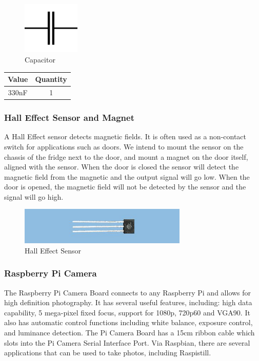 \documentclass[10pt]{article}
\begin{document}
\begin{figure}[h]
\centering
\caption{Capacitor}
\label{Capacitor}
\includegraphics[height=2.5cm]{images/capacitor_diagram.jpg}
\end{figure}

\begin{center}
	\begin{tabular}{|c|c|}
		\hline
		Value & Quantity \\ \hline
		330nF & 1 \\ \hline
	\end{tabular}
\end{center}

\subsubsection{Hall Effect Sensor and Magnet}

A Hall Effect sensor detects magnetic fields. It is often used as a non-contact switch for applications such as doors. We intend to mount the sensor on the chassis of the fridge next to the door, and mount a magnet on the door itself, aligned with the sensor. When the door is closed the sensor will detect the magnetic field from the magnetic and the output signal will go low. When the door is opened, the magnetic field will not be detected by the sensor and the signal will go high.

\begin{figure}[h]
\centering
\caption{Hall Effect Sensor}
\label{Hall Effect Sensor}
\includegraphics[width=8cm]{images/hall-effect-sensor.jpg}
\end{figure}


\subsubsection{Raspberry Pi Camera}

The Raspberry Pi Camera Board connects to any Raspberry Pi and allows for high definition photography. It has several useful features, including: high data capability, 5 mega-pixel fixed focus, support for 1080p, 720p60 and VGA90. It also has automatic control functions including white balance, exposure control, and luminance detection.
The Pi Camera Board has a 15cm ribbon cable which slots into the Pi Camera Serial Interface Port. Via Raspbian, there are several applications that can be used to take photos, including Raspistill.
\end{document}
